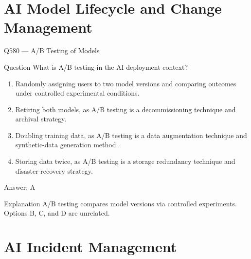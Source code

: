 \documentclass[aspectratio=169,8pt]{beamer}
\begin{document}
	
	\section{AI Model Lifecycle and Change Management}

	
	

	


	
	\begin{frame}{Q580 --- A/B Testing of Models}
		\begin{block}{Question}
			What is A/B testing in the AI deployment context?
			\begin{enumerate}
				\item Randomly assigning users to two model versions and comparing outcomes under controlled experimental conditions.
				\item Retiring both models, as A/B testing is a decommissioning technique and archival strategy.
				\item Doubling training data, as A/B testing is a data augmentation technique and synthetic-data generation method.
				\item Storing data twice, as A/B testing is a storage redundancy technique and disaster-recovery strategy.
			\end{enumerate}
		\end{block}
		\begin{exampleblock}{Answer: A}\end{exampleblock}
		\begin{block}{Explanation}
			A/B testing compares model versions via controlled experiments. Options B, C, and D are unrelated.
		\end{block}
	\end{frame}
	
	\section{AI Incident Management}
\end{document}
